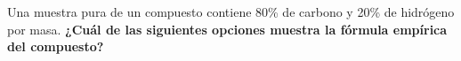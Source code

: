 Una muestra pura de un compuesto contiene 80\% de carbono y 20\% de hidrógeno por masa.
\textbf{¿Cuál de las siguientes opciones muestra la fórmula empírica del compuesto?}

\begin{choices}
    \choice {}
    \choice {}
    \choice {}
    \choice {}
\end{choices}